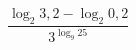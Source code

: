 \begin{ex}
	\begin{condition}
		\( \dfrac{\log_2 3,2-\log_2 0,2}{3^{\log_9 25}} \)
	\end{condition}
\end{ex}